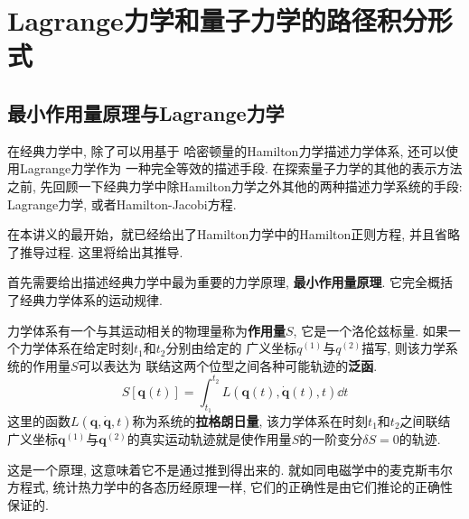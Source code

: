 \chapter{Lagrange力学和量子力学的路径积分形式}

    \section{最小作用量原理与Lagrange力学}        

        在经典力学中, 除了可以用基于
         哈密顿量的Hamilton力学描述力学体系, 还可以使用Lagrange力学作为
         一种完全等效的描述手段. 在探索量子力学的其他的表示方法之前, 
         先回顾一下经典力学中除Hamilton力学之外其他的两种描述力学系统的手段:
          Lagrange力学, 或者Hamilton-Jacobi方程. 
        
        在本讲义的最开始，就已经给出了Hamilton力学中的Hamilton正则方程, 
        并且省略了推导过程. 这里将给出其推导.

        首先需要给出描述经典力学中最为重要的力学原理, \textbf{最小作用量原理}. 
        它完全概括了经典力学体系的运动规律.

        \begin{law}[最小作用量原理]
            力学体系有一个与其运动相关的物理量称为\textbf{作用量}$S$, 
            它是一个洛伦兹标量. 如果一个力学体系在给定时刻$t_1$和$t_2$分别由给定的
            广义坐标$q^{(1)}$与$q^{(2)}$描写, 则该力学系统的作用量$S$可以表达为
            联结这两个位型之间各种可能轨迹的\textbf{泛函}. 
            \begin{equation}
                S[\bm q(t)] = \int_{t_1}^{t_2} L( \bm q(t), \dot{\bm q}(t), t ) \dd t
            \end{equation}
            这里的函数$L(\bm q,\dot{\bm q},t)$称为系统的\textbf{拉格朗日量}, 该力学体系在时刻$t_1$和$t_2$之间联结广义坐标$\bm q^{(1)}$与$\bm q^{(2)}$的真实运动轨迹就是使作用量$S$的一阶变分$\delta S = 0$的轨迹\cite{刘川理力}.
        \end{law}
        这是一个原理, 这意味着它不是通过推到得出来的. 就如同电磁学中的麦克斯韦尔方程式, 
        统计热力学中的各态历经原理一样, 它们的正确性是由它们推论的正确性保证的. 

